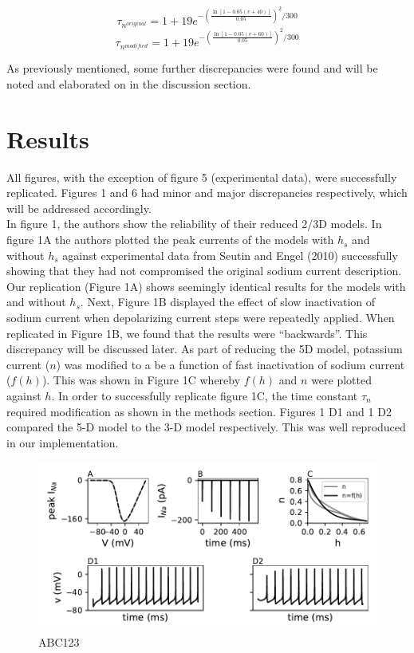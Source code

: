 \begin{center}
	$$\tau_{n^{original}} = 1 + 19 e^{- (\frac{{\ln[1 - 0.05 (v+40)]}}{0.05})^{2}/300}$$
	$$\tau_{n^{modified}} = 1 + 19 e^{- (\frac{{\ln[1 - 0.05 (v+60)]}}{0.05})^{2}/300}$$
\end{center}

As previously mentioned, some further discrepancies were found and will be noted and elaborated on in the discussion section. 


\section{Results}

All figures, with the exception of figure 5 (experimental data), were successfully replicated. Figures 1 and 6 had minor and major discrepancies respectively, which will be addressed accordingly.\\  
In figure 1, the authors show the reliability of their reduced 2/3D models. In figure 1A the authors plotted the peak currents of the models with $h_{s}$ and without $h_{s}$ against experimental data from Seutin and Engel (2010) successfully showing that they had not compromised the original sodium current description.  Our replication (Figure 1A) shows seemingly identical results for the models with and without $h_{s}$. Next, Figure 1B displayed the effect of slow inactivation of sodium current when depolarizing current steps were repeatedly applied. When replicated in Figure 1B, we found that the results were “backwards”. This discrepancy will be discussed later. As part of reducing the 5D model, potassium current ($n$) was modified to a be a function of fast inactivation of sodium current ($f(h)$). This was shown in Figure 1C whereby $f(h)$ and $n$ were plotted against $h$. In order to successfully replicate figure 1C, the time constant $\tau_n$ required modification as shown in the methods section. Figures 1 D1 and 1 D2 compared the 5-D model to the 3-D model respectively. This was well reproduced in our implementation.\\ 

\begin{figure}
	\centering
	\includegraphics[scale=0.7]{../figures/figure_1.pdf}
	\caption{ABC123}
	\label{fig:1}
\end{figure}

